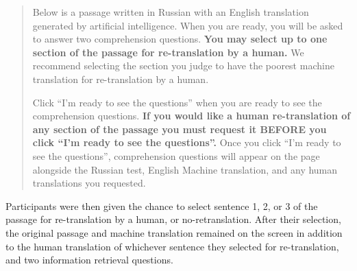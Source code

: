 \begin{quote}
Below is a passage written in Russian with an English translation generated by artificial intelligence. When you are ready, you will be asked to answer two comprehension questions. \textbf{You may select up to one section of the passage for re-translation by a human.} We recommend selecting the section you judge to have the poorest machine translation for re-translation by a human. 

Click ``I’m ready to see the questions'' when you are ready to see the comprehension questions. \textbf{If you would like a human re-translation of any section of the passage you must request it BEFORE you click ``I’m ready to see the questions''.} Once you click ``I’m ready to see the questions'', comprehension questions will appear on the page alongside the Russian test, English Machine translation, and any human translations you requested.  
\end{quote}

Participants were then given the chance to select sentence 1, 2, or 3 of the passage for re-translation by a human, or no-retranslation. After their selection, the original passage and machine translation remained on the screen in addition to the human translation of whichever sentence they selected for re-translation, and two information retrieval questions. 

\begin{table}[]
\caption{N for each condition. }
\label{tab:exp_N}
\end{table}

